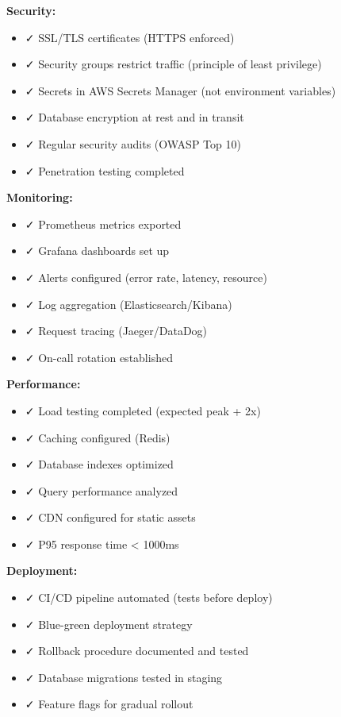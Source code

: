 \documentclass[12pt,a4paper,oneside]{article}
\begin{document}
{{\begin{importantbox}
\textbf{Security:}
\begin{itemize}
    \item ✓ SSL/TLS certificates (HTTPS enforced)
    \item ✓ Security groups restrict traffic (principle of least privilege)
    \item ✓ Secrets in AWS Secrets Manager (not environment variables)
    \item ✓ Database encryption at rest and in transit
    \item ✓ Regular security audits (OWASP Top 10)
    \item ✓ Penetration testing completed
\end{itemize}

\textbf{Monitoring:}
\begin{itemize}
    \item ✓ Prometheus metrics exported
    \item ✓ Grafana dashboards set up
    \item ✓ Alerts configured (error rate, latency, resource)
    \item ✓ Log aggregation (Elasticsearch/Kibana)
    \item ✓ Request tracing (Jaeger/DataDog)
    \item ✓ On-call rotation established
\end{itemize}

\textbf{Performance:}
\begin{itemize}
    \item ✓ Load testing completed (expected peak + 2x)
    \item ✓ Caching configured (Redis)
    \item ✓ Database indexes optimized
    \item ✓ Query performance analyzed
    \item ✓ CDN configured for static assets
    \item ✓ P95 response time < 1000ms
\end{itemize}

\textbf{Deployment:}
\begin{itemize}
    \item ✓ CI/CD pipeline automated (tests before deploy)
    \item ✓ Blue-green deployment strategy
    \item ✓ Rollback procedure documented and tested
    \item ✓ Database migrations tested in staging
    \item ✓ Feature flags for gradual rollout
\end{itemize}


\end{importantbox}}}
\end{document}
